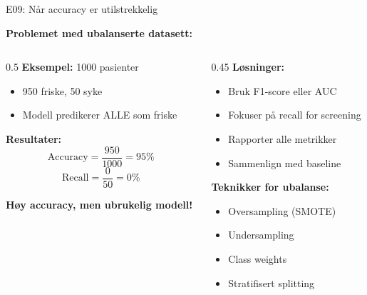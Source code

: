 \documentclass[aspectratio=169, 10pt]{beamer}
\begin{document}
\begin{frame}{E09: Når accuracy er utilstrekkelig}
    
    \textbf{Problemet med ubalanserte datasett:}
    
    \vspace{3mm}
    
    \begin{columns}
        \begin{column}{0.5\textwidth}
            \textbf{Eksempel:} 1000 pasienter
            \begin{itemize}
                \item 950 friske, 50 syke
                \item Modell predikerer ALLE som friske
            \end{itemize}
            
            \vspace{3mm}
            
            \textbf{Resultater:}
            \[
            \text{Accuracy} = \frac{950}{1000} = 95\%
            \]
            \[
            \text{Recall} = \frac{0}{50} = 0\%
            \]
            
            \textbf{Høy accuracy, men ubrukelig modell!}
        \end{column}
        
        \begin{column}{0.45\textwidth}
            \textbf{Løsninger:}
            \begin{itemize}
                \item Bruk F1-score eller AUC
                \item Fokuser på recall for screening
                \item Rapporter alle metrikker
                \item Sammenlign med baseline
            \end{itemize}
            
            \vspace{3mm}
            
            \textbf{Teknikker for ubalanse:}
            \begin{itemize}
                \item Oversampling (SMOTE)
                \item Undersampling
                \item Class weights
                \item Stratifisert splitting
            \end{itemize}
        \end{column}
    \end{columns}
    
\end{frame}
\end{document}
